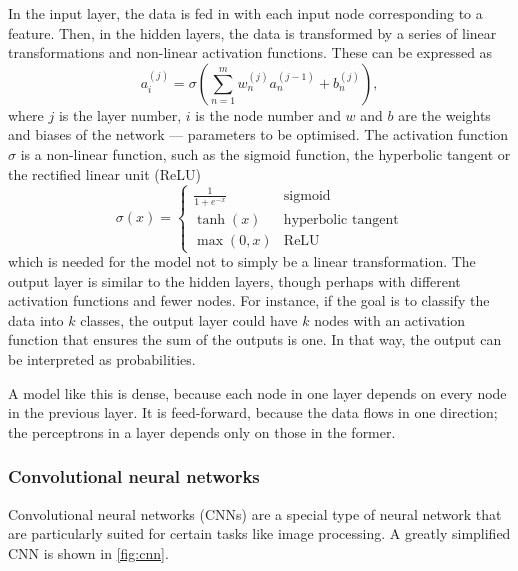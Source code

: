 In the input layer, the data is fed in with each input node corresponding to a feature.
Then, in the hidden layers, the data is transformed by a series of linear transformations and non-linear activation functions.
These can be expressed as
\begin{equation}
    \label{eq:nn}
    a_i^{(j)} = \sigma\left( \sum_{n=1}^m w^{(j)}_n a^{(j-1)}_n + b^{(j)}_n \right),
\end{equation}
where $j$ is the layer number, $i$ is the node number and $w$ and $b$ are the weights and biases of the network — parameters to be optimised.
The activation function $\sigma$ is a non-linear function, such as the sigmoid function, the hyperbolic tangent or the rectified linear unit (ReLU)
\begin{equation}
    \sigma(x) = \begin{cases}
        \frac{1}{1 + e^{-x}} & \text{sigmoid}            \\
        \tanh(x)             & \text{hyperbolic tangent} \\
        \max(0, x)           & \text{ReLU}
    \end{cases}
\end{equation}
which is needed for the model not to simply be a linear transformation.
The output layer is similar to the hidden layers, though perhaps with different activation functions and fewer nodes.
For instance, if the goal is to classify the data into $k$ classes, the output layer could have $k$ nodes with an activation function that ensures the sum of the outputs is one.
In that way, the output can be interpreted as probabilities.

A model like this is dense, because each node in one layer depends on every node in the previous layer.
It is feed-forward, because the data flows in one direction; the perceptrons in a layer depends only on those in the former.



\subsubsection{Convolutional neural networks}
Convolutional neural networks (CNNs) are a special type of neural network that are particularly suited for certain tasks like image processing.
A greatly simplified CNN is shown in \cref{fig:cnn}.

